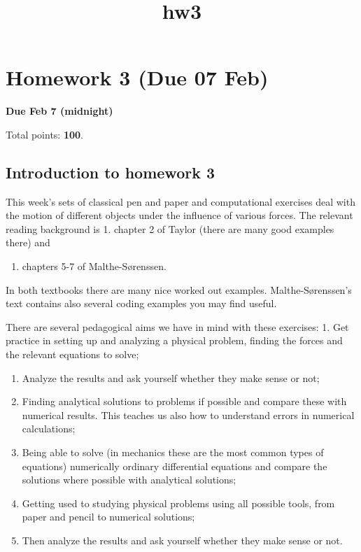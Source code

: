\documentclass[11pt]{article}
\title{hw3}
\providecommand{\tightlist}{%
      \setlength{\itemsep}{0pt}\setlength{\parskip}{0pt}}
\begin{document}
    
    \maketitle
    
    

    
    

    \section{Homework 3 (Due 07 Feb)}\label{homework-3-due-07-feb}

\textbf{Due Feb 7 (midnight)}

Total points: \textbf{100}.

    \subsection{Introduction to homework
3}\label{introduction-to-homework-3}

This week's sets of classical pen and paper and computational exercises
deal with the motion of different objects under the influence of various
forces. The relevant reading background is 1. chapter 2 of Taylor (there
are many good examples there) and

\begin{enumerate}
\def\labelenumi{\arabic{enumi}.}
\setcounter{enumi}{1}
\tightlist
\item
  chapters 5-7 of Malthe-Sørenssen.
\end{enumerate}

In both textbooks there are many nice worked out examples.
Malthe-Sørenssen's text contains also several coding examples you may
find useful.

There are several pedagogical aims we have in mind with these exercises:
1. Get practice in setting up and analyzing a physical problem, finding
the forces and the relevant equations to solve;

\begin{enumerate}
\def\labelenumi{\arabic{enumi}.}
\setcounter{enumi}{1}
\item
  Analyze the results and ask yourself whether they make sense or not;
\item
  Finding analytical solutions to problems if possible and compare these
  with numerical results. This teaches us also how to understand errors
  in numerical calculations;
\item
  Being able to solve (in mechanics these are the most common types of
  equations) numerically ordinary differential equations and compare the
  solutions where possible with analytical solutions;
\item
  Getting used to studying physical problems using all possible tools,
  from paper and pencil to numerical solutions;
\item
  Then analyze the results and ask yourself whether they make sense or
  not.
\end{enumerate}
\end{document}
